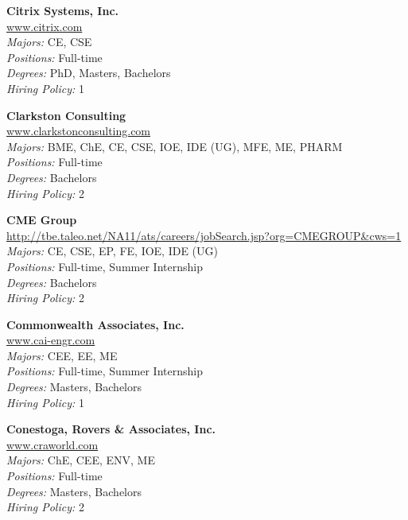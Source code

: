 \documentclass{article}
\begin{document}
\begin{center}
\begin{multicols}{3}
\begin{minipage}{.9\columnwidth}{\Large\bf Citrix Systems, Inc. }\\
	\url{www.citrix.com}\\
	\emph{Majors:} CE, CSE\\
	\emph{Positions:} Full-time\\
	\emph{Degrees:} PhD, Masters, Bachelors\\
	\emph{Hiring Policy:} 1\\
\end{minipage}
 
\begin{minipage}{.9\columnwidth}{\Large\bf Clarkston Consulting }\\
	\url{www.clarkstonconsulting.com}\\
	\emph{Majors:} BME, ChE, CE, CSE, IOE, IDE (UG), MFE, ME, PHARM\\
	\emph{Positions:} Full-time\\
	\emph{Degrees:} Bachelors\\
	\emph{Hiring Policy:} 2\\
\end{minipage}
 
\begin{minipage}{.9\columnwidth}{\Large\bf CME Group }\\
	\url{http://tbe.taleo.net/NA11/ats/careers/jobSearch.jsp?org=CMEGROUP&cws=1}\\
	\emph{Majors:} CE, CSE, EP, FE, IOE, IDE (UG)\\
	\emph{Positions:} Full-time, Summer Internship\\
	\emph{Degrees:} Bachelors\\
	\emph{Hiring Policy:} 2\\
\end{minipage}
 
\begin{minipage}{.9\columnwidth}{\Large\bf Commonwealth Associates, Inc. }\\
	\url{www.cai-engr.com}\\
	\emph{Majors:} CEE, EE, ME\\
	\emph{Positions:} Full-time, Summer Internship\\
	\emph{Degrees:} Masters, Bachelors\\
	\emph{Hiring Policy:} 1\\
\end{minipage}
 
\begin{minipage}{.9\columnwidth}{\Large\bf Conestoga, Rovers \& Associates, Inc. }\\
	\url{www.craworld.com}\\
	\emph{Majors:} ChE, CEE, ENV, ME\\
	\emph{Positions:} Full-time\\
	\emph{Degrees:} Masters, Bachelors\\
	\emph{Hiring Policy:} 2\\
\end{minipage}
 

\end{multicols}
\end{center}
\end{document}
